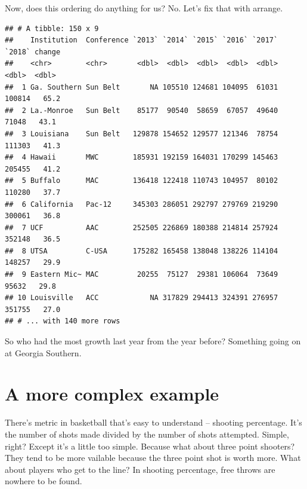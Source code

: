 \documentclass[]{book}
\newenvironment{Shaded}{\begin{snugshade}}{\end{snugshade}}
\newcommand{\KeywordTok}[1]{\textcolor[rgb]{0.13,0.29,0.53}{\textbf{#1}}}
\newcommand{\DataTypeTok}[1]{\textcolor[rgb]{0.13,0.29,0.53}{#1}}
\newcommand{\DecValTok}[1]{\textcolor[rgb]{0.00,0.00,0.81}{#1}}
\newcommand{\StringTok}[1]{\textcolor[rgb]{0.31,0.60,0.02}{#1}}
\newcommand{\OperatorTok}[1]{\textcolor[rgb]{0.81,0.36,0.00}{\textbf{#1}}}
\newcommand{\NormalTok}[1]{#1}
\begin{document}
Now, does this ordering do anything for us? No. Let's fix that with
arrange.

\begin{Shaded}
\end{Shaded}

\begin{verbatim}
## # A tibble: 150 x 9
##    Institution  Conference `2013` `2014` `2015` `2016` `2017` `2018` change
##    <chr>        <chr>       <dbl>  <dbl>  <dbl>  <dbl>  <dbl>  <dbl>  <dbl>
##  1 Ga. Southern Sun Belt       NA 105510 124681 104095  61031 100814   65.2
##  2 La.-Monroe   Sun Belt    85177  90540  58659  67057  49640  71048   43.1
##  3 Louisiana    Sun Belt   129878 154652 129577 121346  78754 111303   41.3
##  4 Hawaii       MWC        185931 192159 164031 170299 145463 205455   41.2
##  5 Buffalo      MAC        136418 122418 110743 104957  80102 110280   37.7
##  6 California   Pac-12     345303 286051 292797 279769 219290 300061   36.8
##  7 UCF          AAC        252505 226869 180388 214814 257924 352148   36.5
##  8 UTSA         C-USA      175282 165458 138048 138226 114104 148257   29.9
##  9 Eastern Mic~ MAC         20255  75127  29381 106064  73649  95632   29.8
## 10 Louisville   ACC            NA 317829 294413 324391 276957 351755   27.0
## # ... with 140 more rows
\end{verbatim}

So who had the most growth last year from the year before? Something
going on at Georgia Southern.

\section{A more complex example}\label{a-more-complex-example}

There's metric in basketball that's easy to understand -- shooting
percentage. It's the number of shots made divided by the number of shots
attempted. Simple, right? Except it's a little too simple. Because what
about three point shooters? They tend to be more vailable because the
three point shot is worth more. What about players who get to the line?
In shooting percentage, free throws are nowhere to be found.
\end{document}

